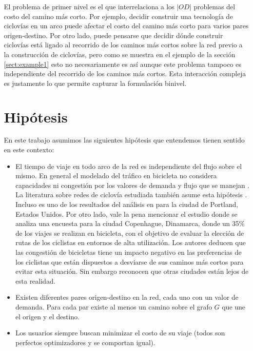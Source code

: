 El problema de primer nivel es el que interrelaciona a los $|OD|$ problemas del costo del camino más corto. Por ejemplo, decidir construir una tecnología de ciclovías en un arco puede afectar el costo del camino más corto para varios pares origen-destino. Por otro lado, puede pensarse que decidir dónde construir ciclovías está ligado al recorrido de los caminos más cortos sobre la red previo a la construcción de ciclovías, pero como se muestra en el ejemplo de la sección \ref{sect:example1} esto no necesariamente es así aunque este problema tampoco es independiente del recorrido de los caminos más cortos. Esta interacción compleja es justamente lo que permite capturar la formulación binivel.

\section{Hipótesis}

En este trabajo asumimos las siguientes hipótesis que entendemos tienen sentido en este contexto:

\begin{itemize}
    \item{El tiempo de viaje en todo arco de la red es independiente del flujo sobre el mismo. En general el modelado del tráfico en bicicleta no considera capacidades ni congestión por los valores de demanda y flujo que se manejan \parencite{Sheffi1985}. La literatura sobre redes de ciclovía estudiada también asume esta hipótesis \parencite{Lin2013, Duthie2014, Liu2019, Zhu2019, baya2021}. Incluso es uno de los resultados del análisis en \textcite{broach2012} para la ciudad de Portland, Estados Unidos. Por otro lado, vale la pena mencionar el estudio \textcite{Vedel2017} donde se analiza una encuesta para la ciudad Copenhague, Dinamarca, donde un 35\% de los viajes se realizan en bicicleta, con el objetivo de evaluar la elección de rutas de los ciclistas en entornos de alta utilización. Los autores deducen que las congestión de bicicletas tiene un impacto negativo en las preferencias de los ciclistas que están dispuestos a desviarse de sus caminos más cortos para evitar esta situación. Sin embargo reconocen que otras ciudades están lejos de esta realidad.}
  \item{Existen diferentes pares origen-destino en la red, cada uno con un valor de demanda. Para cada par existe al menos un camino sobre el grafo $G$ que une el origen y el destino.}
  \item{Los usuarios siempre buscan minimizar el costo de su viaje (todos son perfectos optimizadores y se comportan igual).}
\end{itemize}

